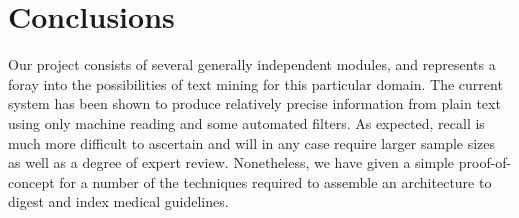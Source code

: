 \documentclass[12pt,letterpaper]{article}
\begin{document}
\section{Conclusions}

Our project consists of several generally independent modules, and represents a foray into the possibilities of text mining for this particular domain. The current system has been shown to produce relatively precise information from plain text using only machine reading and some automated filters. As expected, recall is much more difficult to ascertain and will in any case require larger sample sizes as well as a degree of expert review. Nonetheless, we have given a simple proof-of-concept for a number of the techniques required to assemble an architecture to digest and index medical guidelines.



\end{document}
